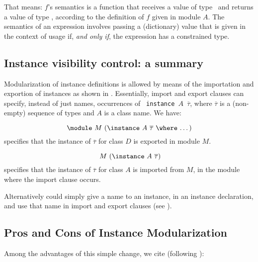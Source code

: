 That means: $f$'s semantics is a function that receives a value of
type \String\ and returns a value of type \String, according to the
definition of $f$ given in module $A$. The semantics of an expression
involves passing a (dictionary) value that is given in the context of
usage if, {\em and only if}, the expression has a constrained type.

\subsection{Instance visibility control: a summary}
\label{subsec:instance-visibility-control}

Modularization of instance definitions is allowed by means of the
importation and exportion of instances as shown in
\cite{Controlling-scope-instances}. Essentially, import and export
clauses can specify, instead of just names, occurrences of {\tt
  instance $A$ $\overline{\tau}$}, where $\overline{\tau}$ is a
(non-empty) sequence of types and $A$ is a class name.  We have:

  \[ \text{\module\ $M$ (\instance\ $A$ $\overline{\tau}$ \where\ \ldots)} \]
specifies that the instance of $\overline{\tau}$ for class $D$ is
exported in module $M$.

  \[ \text{\ $M$ (\instance\ $A$ $\overline{\tau}$)} \]
specifies that the instance of $\overline{\tau}$ for class $A$ is
imported from $M$, in the module where the import clause occurs.

Alternatively could simply give a name to an instance, in an instance
declaration, and use that name in import and export clauses (see
\cite{Controlling-scope-instances}).

\subsection{Pros and Cons of Instance Modularization}

Among the advantages of this simple change, we cite (following
\cite{Controlling-scope-instances}):

